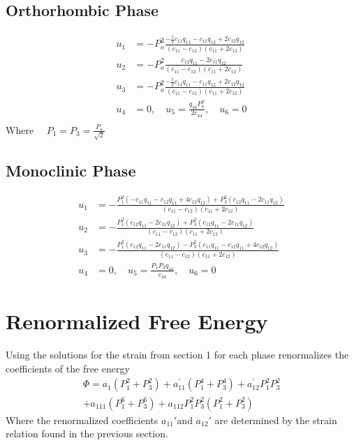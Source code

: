 \documentclass{article}
\begin{document}
\subsection{Orthorhombic Phase}
\begin{align}
u_1 &= - P_o^2 \frac{-\frac{1}{2} c_{11} q_{11} -c_{11} q_{12}+2 c_{12} q_{12} }{\left(c_{11}-c_{12}\right) \left(c_{11}+2 c_{12}\right)} \\
u_2 &= - P_o^2 \frac{c_{12} q_{11} -2 c_{11} q_{12}}{\left(c_{11}-c_{12}\right) \left(c_{11}+2 c_{12}\right)} \\
u_3 &= - P_o^2 \frac{-\frac{1}{2} c_{11} q_{11} -c_{11} q_{12} +2 c_{12} q_{12} }{\left(c_{11}-c_{12}\right) \left(c_{11}+2 c_{12}\right)} \\
u_4 &= 0, \quad u_5 = \frac{q_{44} P_o^2}{2 c_{44}}, \quad u_6= 0 \\
\end{align}
Where $ \quad  P_1=P_3=\frac{P_o}{\sqrt{2}} $

\subsection{Monoclinic Phase}
\begin{align}
u_1 &=-\frac{P_1^2(-c_{11} q_{11}-c_{12} q_{11}+4 c_{12}  q_{12})+P_3^2 (c_{12} q_{11}-2 c_{11}  q_{12})}{\left(c_{11}-c_{12}\right) \left(c_{11}+2 c_{12}\right)} \\
u_2&= -\frac{P_1^2 (c_{12} q_{11}-2 c_{11}  q_{12})+P_3^2(c_{12}  q_{11}-2 c_{11} q_{12})}{\left(c_{11}-c_{12}\right) \left(c_{11}+2 c_{12}\right)} \\
u_3 &= -\frac{P_1^2 (c_{12} q_{11}-2 c_{11} q_{12})- P_3^2(c_{11} q_{11}-c_{12} q_{11}+4 c_{12}  q_{12})}{\left(c_{11}-c_{12}\right) \left(c_{11}+2 c_{12}\right)} \\
u_4 &= 0, \quad u_5= \frac{P_1 P_3 q_{44}}{c_{44}}, \quad u_6= 0
\end{align}


\section{Renormalized Free Energy}
Using the solutions for the strain from section 1 for each phase renormalizes the coefficients of the free energy
\begin{align}
\Phi=a_1 ( P_1^2+P_3^2 )+ a_{11}^\prime ( P_1^4 + P_3^4)+ a_{12} ^\prime P_1^2 P_3^2 \\ 
          +a_{111} ( P_1^6+P_3^6)+ a_{112} P_1^2 P_3^2( P_1^2 +P_3^2) \nonumber
\end{align}
Where the renormalized coefficients $ a_{11}' \text{and } a_{12}' $ are determined by the strain relation found in the previous section.
\end{document}
